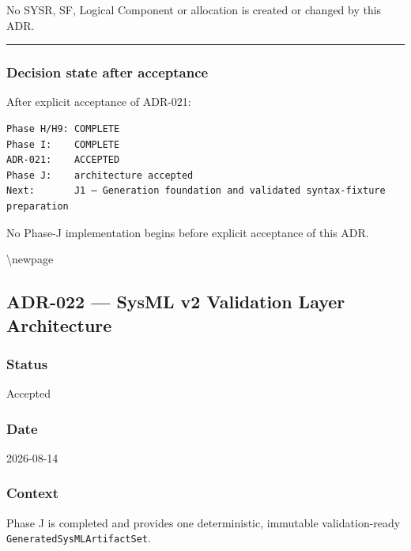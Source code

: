 No SYSR, SF, Logical Component or allocation is created or changed by this ADR.

\begin{center}\rule{0.5\linewidth}{0.5pt}\end{center}

\hypertarget{decision-state-after-acceptance}{%
\subsubsection{Decision state after acceptance}\label{decision-state-after-acceptance}}

After explicit acceptance of ADR-021:

\begin{verbatim}
Phase H/H9: COMPLETE
Phase I:    COMPLETE
ADR-021:    ACCEPTED
Phase J:    architecture accepted
Next:       J1 — Generation foundation and validated syntax-fixture preparation
\end{verbatim}

No Phase-J implementation begins before explicit acceptance of this ADR.

\textbackslash newpage

\hypertarget{adr-022--sysml-v2-validation-layer-architecture}{%
\subsection{ADR-022 --- SysML v2 Validation Layer Architecture}\label{adr-022--sysml-v2-validation-layer-architecture}}

\hypertarget{status-4}{%
\subsubsection{Status}\label{status-4}}

Accepted

\hypertarget{date-4}{%
\subsubsection{Date}\label{date-4}}

2026-08-14

\hypertarget{context-7}{%
\subsubsection{Context}\label{context-7}}

Phase J is completed and provides one deterministic, immutable validation-ready \texttt{GeneratedSysMLArtifactSet}.

